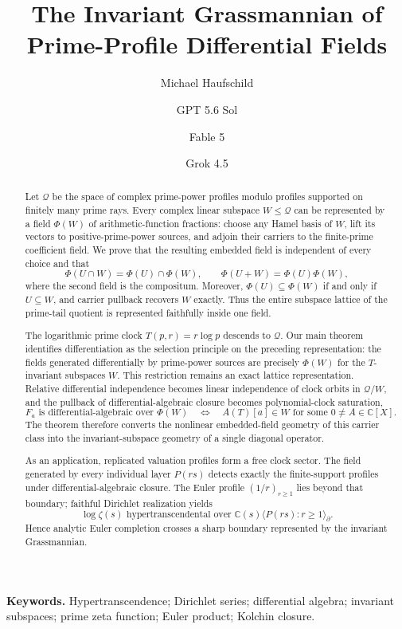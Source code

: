 \documentclass[11pt]{article}
\title{The Invariant Grassmannian of Prime-Profile Differential Fields}
\author{Michael Haufschild \and GPT 5.6 Sol \and Fable 5 \and Grok 4.5}
\date{}
\theoremstyle{definition}
\theoremstyle{remark}
\newcommand{\C}{\mathbb C}
\newcommand{\cQ}{\mathcal Q}
\newcommand{\diff}{\partial}
\begin{document}
\maketitle

\begin{abstract}
Let \(\cQ\) be the space of complex prime-power profiles modulo profiles supported on finitely
many prime rays.  Every complex linear subspace \(W\leq\cQ\) can be represented by a field
\(\Phi(W)\) of arithmetic-function fractions: choose any Hamel basis of \(W\), lift its vectors
to positive-prime-power sources, and adjoin their carriers to the finite-prime coefficient field.
We prove that the resulting embedded field is independent of every choice and that
\[
 \Phi(U\cap W)=\Phi(U)\cap\Phi(W),\qquad
 \Phi(U+W)=\Phi(U)\Phi(W),
\]
where the second field is the compositum.  Moreover,
\(\Phi(U)\subseteq\Phi(W)\) if and only if \(U\subseteq W\), and carrier pullback recovers
\(W\) exactly.  Thus the entire subspace lattice of the prime-tail quotient is represented
faithfully inside one field.

The logarithmic prime clock \(T(p,r)=r\log p\) descends to \(\cQ\).  Our main theorem identifies
differentiation as the selection principle on the preceding representation: the fields generated
differentially by prime-power sources are precisely \(\Phi(W)\) for the \(T\)-invariant
subspaces \(W\).  This restriction remains an exact lattice representation.  Relative
differential independence becomes linear independence of clock orbits in \(\cQ/W\), and the
pullback of differential-algebraic closure becomes polynomial-clock saturation,
\[
 F_a\text{ is differential-algebraic over }\Phi(W)
 \quad\Longleftrightarrow\quad
 A(T)[a]\in W\text{ for some }0\neq A\in\C[X].
\]
The theorem therefore converts the nonlinear embedded-field geometry of this carrier class into
the invariant-subspace geometry of a single diagonal operator.

As an application, replicated valuation profiles form a free clock sector.  The field generated
by every individual layer \(P(rs)\) detects exactly the finite-support profiles under
differential-algebraic closure.  The Euler profile \((1/r)_{r\geq1}\) lies beyond that boundary;
faithful Dirichlet realization yields
\[
 \log\zeta(s)\text{ hypertranscendental over }
 \C(s)\langle P(rs):r\geq1\rangle_{\diff}.
\]
Hence analytic Euler completion crosses a sharp boundary represented by the invariant
Grassmannian.
\end{abstract}

\noindent\textbf{Keywords.}
Hypertranscendence; Dirichlet series; differential algebra; invariant subspaces;
prime zeta function; Euler product; Kolchin closure.
\end{document}
